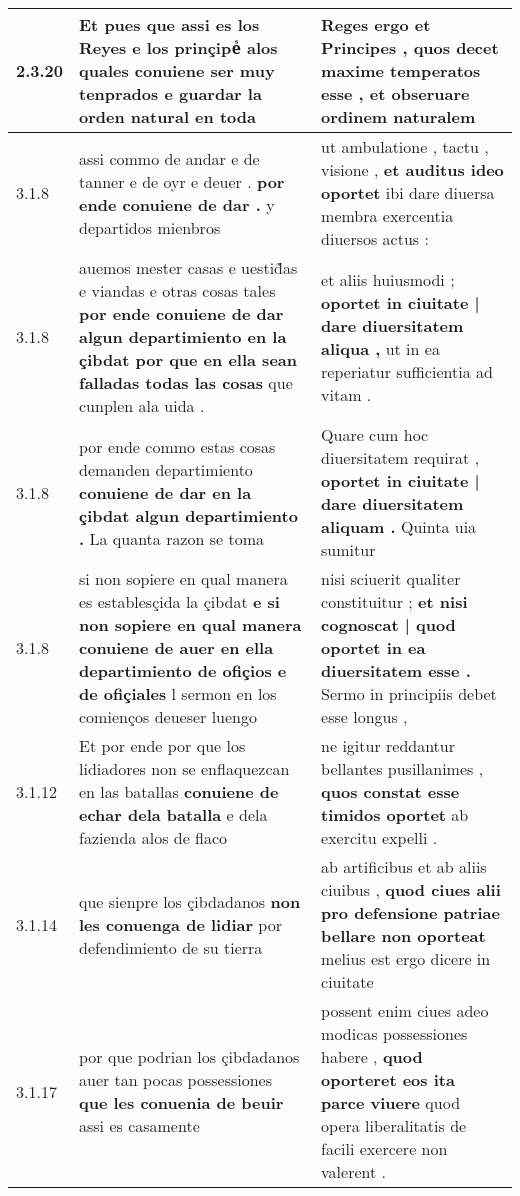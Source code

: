 \begin{tabular}{|p{1cm}|p{6.5cm}|p{6.5cm}|}
2.3.20 & Et pues que assi es los Reyes \textbf{ e los prinçipeᷤ alos quales conuiene ser muy tenprados } e guardar la orden natural en toda & Reges ergo et Principes , \textbf{ quos decet maxime temperatos esse , } et obseruare ordinem naturalem \\\hline
3.1.8 & assi commo de andar e de tanner e de oyr e deuer . \textbf{ por ende conuiene de dar . } y departidos mienbros & ut ambulatione , tactu , visione , \textbf{ et auditus ideo oportet } ibi dare diuersa membra exercentia diuersos actus : \\\hline
3.1.8 & auemos mester casas e uestid̃as e viandas e otras cosas tales \textbf{ por ende conuiene de dar algun departimiento en la çibdat por que en ella sean falladas todas las cosas } que cunplen ala uida . & et aliis huiusmodi ; \textbf{ oportet in ciuitate | dare diuersitatem aliqua , } ut in ea reperiatur sufficientia ad vitam . \\\hline
3.1.8 & por ende commo estas cosas demanden departimiento \textbf{ conuiene de dar en la çibdat algun departimiento . } La quanta razon se toma & Quare cum hoc diuersitatem requirat , \textbf{ oportet in ciuitate | dare diuersitatem aliquam . } Quinta uia sumitur \\\hline
3.1.8 & si non sopiere en qual manera es establesçida la çibdat \textbf{ e si non sopiere en qual manera conuiene de auer en ella departimiento de ofiçios e de ofiçiales } l sermon en los comienços deueser luengo & nisi sciuerit qualiter constituitur ; \textbf{ et nisi cognoscat | quod oportet in ea diuersitatem esse . } Sermo in principiis debet esse longus , \\\hline
3.1.12 & Et por ende por que los lidiadores non se enflaquezcan en las batallas \textbf{ conuiene de echar dela batalla } e dela fazienda alos de flaco & ne igitur reddantur bellantes pusillanimes , \textbf{ quos constat esse timidos oportet } ab exercitu expelli . \\\hline
3.1.14 & que sienpre los çibdadanos \textbf{ non les conuenga de lidiar } por defendimiento de su tierra & ab artificibus et ab aliis ciuibus , \textbf{ quod ciues alii pro defensione patriae bellare non oporteat } melius est ergo dicere in ciuitate \\\hline
3.1.17 & por que podrian los çibdadanos auer tan pocas possessiones \textbf{ que les conuenia de beuir } assi es casamente & possent enim ciues adeo modicas possessiones habere , \textbf{ quod oporteret eos ita parce viuere } quod opera liberalitatis de facili exercere non valerent . \\\hline

\end{tabular}
